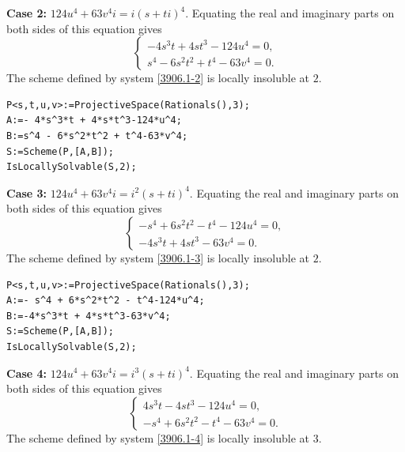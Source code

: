 \documentclass[a4paper,12pt,english,reqno]{amsart}
\begin{document}
{\bf Case 2:} $124u^4+63v^4i=i(s+ti)^4$. Equating the real and imaginary parts on both sides of this equation gives
\begin{equation}\label{3906.1-2}
\begin{cases}
-4s^3t + 4st^3 - 124u^4=0,\\
s^4 - 6s^2t^2 + t^4 - 63v^4=0.
\end{cases}
\end{equation}
The scheme defined by system \eqref{3906.1-2} is locally insoluble at $2$.

%

\begin{lstlisting}
P<s,t,u,v>:=ProjectiveSpace(Rationals(),3);
A:=- 4*s^3*t + 4*s*t^3-124*u^4;
B:=s^4 - 6*s^2*t^2 + t^4-63*v^4;
S:=Scheme(P,[A,B]);
IsLocallySolvable(S,2);
\end{lstlisting}


{\bf Case 3:} $124u^4+63v^4i=i^2(s+ti)^4$. Equating the real and imaginary parts on both sides of this equation gives
\begin{equation}\label{3906.1-3}
\begin{cases}
-s^4 + 6s^2t^2 - t^4 -124u^4=0,\\
-4s^3t + 4st^3 - 63v^4=0.
\end{cases}
\end{equation}
The scheme defined by system \eqref{3906.1-3} is locally insoluble at $2$.

\begin{lstlisting}
P<s,t,u,v>:=ProjectiveSpace(Rationals(),3);
A:=- s^4 + 6*s^2*t^2 - t^4-124*u^4;
B:=-4*s^3*t + 4*s*t^3-63*v^4;
S:=Scheme(P,[A,B]);
IsLocallySolvable(S,2);
\end{lstlisting}


{\bf Case 4:} $124u^4+63v^4i=i^3(s+ti)^4$. Equating the real and imaginary parts on both sides of this equation gives
\begin{equation}\label{3906.1-4}
\begin{cases}
4s^3t - 4st^3 - 124u^4=0,\\
-s^4 + 6s^2t^2 - t^4 - 63v^4=0.
\end{cases}
\end{equation}
The scheme defined by system \eqref{3906.1-4} is locally insoluble at $3$.
\end{document}
